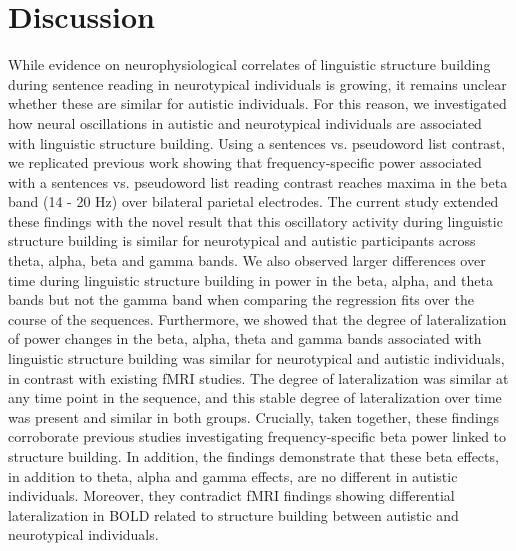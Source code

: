 \section{Discussion}
While evidence on neurophysiological correlates of linguistic structure building during sentence reading in neurotypical individuals is growing, it remains unclear whether these are similar for autistic individuals. For this reason, we investigated how neural oscillations in autistic and neurotypical individuals are associated with linguistic structure building. Using a sentences vs. pseudoword list contrast, we replicated previous work showing that frequency-specific power associated with a sentences vs. pseudoword list reading contrast reaches maxima in the beta band (14 - 20 Hz) over bilateral parietal electrodes. The current study extended these findings with the novel result that this oscillatory activity during linguistic structure building is similar for neurotypical and autistic participants across theta, alpha, beta and gamma bands. We also observed larger differences over time during linguistic structure building in power in the beta, alpha, and theta bands but not the gamma band when comparing the regression fits over the course of the sequences. Furthermore, we showed that the degree of lateralization of power changes in the beta, alpha, theta and gamma bands associated with linguistic structure building was similar for neurotypical and autistic individuals, in contrast with existing fMRI studies. The degree of lateralization was similar at any time point in the sequence, and this stable degree of lateralization over time was present and similar in both groups. Crucially, taken together, these findings corroborate previous studies investigating frequency-specific beta power linked to structure building. In addition, the findings demonstrate that these beta effects, in addition to theta, alpha and gamma effects, are no different in autistic individuals. Moreover, they contradict fMRI findings \citep{jouravlev2020} showing differential lateralization in BOLD related to structure building between autistic and neurotypical individuals.


